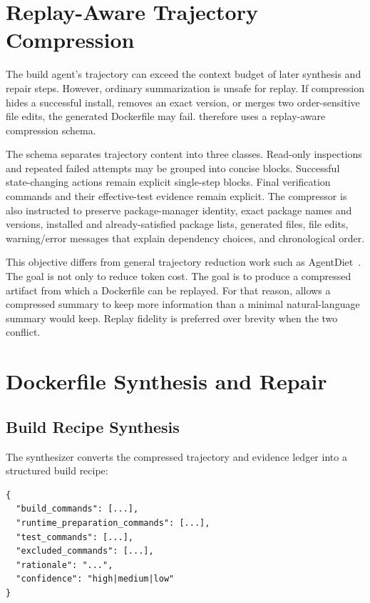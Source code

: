 \section{Replay-Aware Trajectory Compression}

The build agent's trajectory can exceed the context budget of later synthesis and repair steps.
However, ordinary summarization is unsafe for replay.
If compression hides a successful install, removes an exact version, or merges two order-sensitive file edits, the generated Dockerfile may fail.
\tool therefore uses a replay-aware compression schema.

The schema separates trajectory content into three classes.
Read-only inspections and repeated failed attempts may be grouped into concise blocks.
Successful state-changing actions remain explicit single-step blocks.
Final verification commands and their effective-test evidence remain explicit.
The compressor is also instructed to preserve package-manager identity, exact package names and versions, installed and already-satisfied package lists, generated files, file edits, warning/error messages that explain dependency choices, and chronological order.

This objective differs from general trajectory reduction work such as AgentDiet~\cite{xiao2025agentdiet}.
The goal is not only to reduce token cost.
The goal is to produce a compressed artifact from which a Dockerfile can be replayed.
For that reason, \tool allows a compressed summary to keep more information than a minimal natural-language summary would keep.
Replay fidelity is preferred over brevity when the two conflict.

\section{Dockerfile Synthesis and Repair}

\subsection{Build Recipe Synthesis}

The synthesizer converts the compressed trajectory and evidence ledger into a structured build recipe:

\begin{lstlisting}[basicstyle=\ttfamily\small]
{
  "build_commands": [...],
  "runtime_preparation_commands": [...],
  "test_commands": [...],
  "excluded_commands": [...],
  "rationale": "...",
  "confidence": "high|medium|low"
}
\end{lstlisting}

